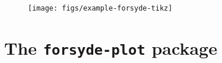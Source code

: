 \begin{figure}[htb]\centering
\texttt{[image: figs/example-forsyde-tikz]}
\end{figure}


\section{The \texttt{forsyde-plot} package}
\label{sec:forsyde-plot-package}


